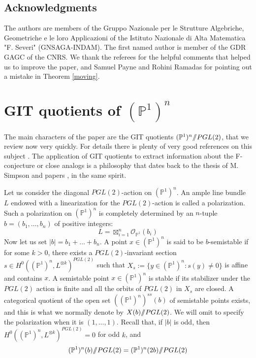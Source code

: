 \documentclass[a4paper,10pt]{amsart}
\theoremstyle{definition}
\renewcommand{\P}{\mathbb{P}}
\newcommand{\quot}{/\hspace{-1.2mm}/}
\begin{document}
\subsection*{Acknowledgments}
The authors are members of the Gruppo Nazionale per le Strutture Algebriche, Geometriche e le loro Applicazioni of the Istituto Nazionale di Alta Matematica "F. Severi" (GNSAGA-INDAM). The first named author is member of the GDR GAGC of the CNRS. We thank the referees for the helpful comments that helped us to improve the paper, and Samuel Payne and Rohini Ramadas for pointing out a mistake in Theorem \ref{moving}.

 

\section{GIT quotients of $(\mathbb{P}^1)^n$}\label{pre}
The main characters of the paper are the GIT quotients $(\P^1)^n\quot  PGL(2)$, that we review now very quickly. For details there is plenty of very good references on this subject \cite{Do03,Do12,HMSV09,Bo11,DO88}. The application of GIT quotients to extract information about the F-conjecture or close analogs is a philosophy that dates back to the thesis of M. Simpson \cite{Si08} and papers \cite{GS11,BG15}, in the same spirit.

Let us consider the diagonal $PGL(2)$-action on $(\mathbb{P}^1)^n$. An ample line bundle $L$ endowed
with a linearization for the $PGL(2)$-action is called a polarization. Such a polarization on $(\mathbb{P}^1)^n$
is completely determined by an $n$-tuple $b = (b_1,\dots,b_n)$ of positive integers: 
$$L = \boxtimes_{i=1}^n\mathcal{O}_{\mathbb{P}^1}(b_i)$$
Now let us set $|b| = b_1+\dots+b_n$. A point $x\in (\mathbb{P}^1)^n$ is said to be $b$-semistable if for some $k > 0$, there exists a $PGL(2)$-invariant section $s \in H^0((\mathbb{P}^1)^n,L^{\otimes k})^{PGL(2)}$ such that $X_s:=\{ y\in (\mathbb{P}^1)^n: s(y)\neq 0\}$ is affine and contains $x$. A semistable point $x \in (\mathbb{P}^1)^n$ is stable if its stabilizer under the $PGL(2)$ action is finite and all the orbits of $PGL(2)$ in $X_s$ are closed. A categorical quotient of the open set $((\mathbb{P}^1)^n)^{ss}(b)$ of semistable points exists, and this is what we normally denote by $X(b)\quot PGL(2)$. We will omit to specify the polarization when it is $(1,\dots,1)$. Recall that, if $|b|$ is odd, then $H^0((\mathbb{P}^1)^n,L^{\otimes k})^{PGL(2)}=0$ for odd $k$, and 
\begin{equation}\label{perdue}
(\mathbb{P}^1)^n(b)\quot PGL(2) = (\mathbb{P}^1)^n(2b)\quot PGL(2)
\end{equation}
\end{document}

